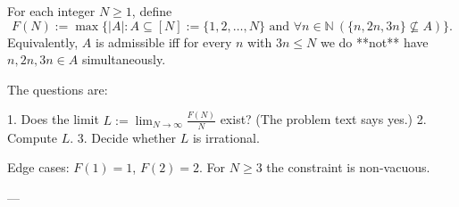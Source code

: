 For each integer $N\ge 1$, define
\[
F(N):=\max\bigl\{|A|: A\subseteq [N]:=\{1,2,\dots,N\}\text{ and }\forall n\in\mathbb N\ (\{n,2n,3n\}\not\subseteq A)\bigr\}.
\]
Equivalently, $A$ is admissible iff for every $n$ with $3n\le N$ we do **not** have $n,2n,3n\in A$ simultaneously.

The questions are:

1. Does the limit $\displaystyle L:=\lim_{N\to\infty} \frac{F(N)}{N}$ exist? (The problem text says yes.)
2. Compute $L$.
3. Decide whether $L$ is irrational.

Edge cases: $F(1)=1$, $F(2)=2$. For $N\ge 3$ the constraint is non-vacuous.

---
